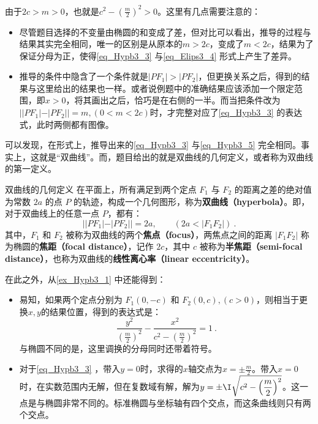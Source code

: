 由于$2c>m>0$，也就是$\displaystyle c^2-\left(\frac{m}{2}\right)^2>0$。这里有几点需要注意的：
\begin{itemize}
\item 尽管题目选择的不变量由椭圆的和变成了差，但对比可以看出，推导的过程与结果其实完全相同，唯一的区别是从原本的$m>2c$，变成了$m<2c$，结果为了保证分母为正，使得\autoref{eq_Hypb3_3} 与\autoref{eq_Elips3_4} 形式上产生了差异。
\item 推导的条件中隐含了一个条件就是$|PF_1| >|PF_2|$，但更换关系之后，得到的结果与这里给出的结果也一样。或者说例题中的准确结果应该添加一个限定范围，即$x>0$，将其画出之后，恰巧是在右侧的一半。而当把条件改为$||PF_1| - |PF_2|| = m,(0<m <2c)$时，才完整对应了\autoref{eq_Hypb3_3} 的表达式，此时两侧都有图像。
\end{itemize}

可以发现，在形式上，推导出来的\autoref{eq_Hypb3_3} 与\autoref{eq_Hypb3_5} 完全相同。事实上，这就是“双曲线”。而，题目给出的就是双曲线的几何定义，或者称为双曲线的第一定义。

\begin{definition}{双曲线的几何定义}
在平面上，所有满足到两个定点 $F_1$ 与 $F_2$ 的距离之差的绝对值为常数 $2a$ 的点 $P$ 的轨迹，构成一个几何图形，称为\textbf{双曲线（hyperbola）}。即，对于双曲线上的任意一点 $P$，都有：
\begin{equation}
||PF_1| - |PF_2|| = 2a ,\qquad(2a<|F_1F_2|)~.
\end{equation}
其中，$F_1$ 和 $F_2$ 被称为双曲线的两个\textbf{焦点（focus）}，两焦点之间的距离 $|F_1F_2|$ 称为椭圆的\textbf{焦距（focal distance）}，记作 $2c$，其中 $c$ 被称为\textbf{半焦距（semi-focal distance）}，也称为双曲线的\textbf{线性离心率（linear eccentricity）}。
\end{definition}

在此之外，从\autoref{ex_Hypb3_1} 中还能得到：
\begin{itemize}
\item 易知，如果两个定点分别为 $F_1(0,-c)$ 和 $F_2(0,c),(c>0)$，则相当于更换$x,y$的结果位置，得到的表达式是：
\begin{equation}
\frac{y^2}{\left(\displaystyle\frac{m}{2}\right)^2}-\frac{x^2}{\displaystyle c^2-\left(\frac{m}{2}\right)^2} =1~.
\end{equation}
与椭圆不同的是，这里调换的分母同时还带着符号。
\item 对于\autoref{eq_Hypb3_3} ，带入$y=0$时，求得的$x$轴交点为$\displaystyle x=\pm\frac{m}{2}$。带入$x=0$时，在实数范围内无解，但在复数域有解，解为$\displaystyle y=\pm\I\sqrt{c^2-\left(\frac{m}{2}\right)^2}$。这一点是与椭圆非常不同的。标准椭圆与坐标轴有四个交点，而这条曲线则只有两个交点。
\end{itemize}

